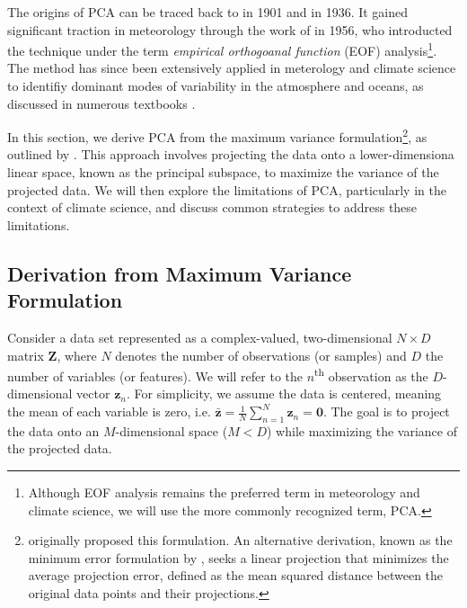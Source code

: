 The origins of PCA can be traced back to \citet{pearson_lines_1901} in 1901 and \citet{hotelling_relations_1936} in 1936. It gained significant traction in meteorology through the work of \citet{lorenz_empirical_1956} in 1956, who introducted the technique under the term \textit{empirical orthogoanal function} (EOF) analysis\footnote{Although EOF analysis remains the preferred term in meteorology and climate science, we will use the more commonly recognized term, PCA.}. The method has since been extensively applied in meterology and climate science to identifiy dominant modes of variability in the atmosphere and oceans, as discussed in numerous textbooks \cite[e.g.][]{preisendorfer_principal_1988,jolliffe_principal_2002,storch_statistical_2003,hannachi_patterns_2021,wilks_statistical_2019,delsole_statistical_2022}. 

In this section, we derive PCA from the maximum variance formulation\footnote{\citet{hotelling_relations_1936} originally proposed this formulation. An alternative derivation, known as the minimum error formulation by \citet{pearson_lines_1901}, seeks a linear projection that minimizes the average projection error, defined as the mean squared distance between the original data points and their projections.}, as outlined by \citet[][pp.~561-563]{bishop_pattern_2006}. This approach involves projecting the data onto a lower-dimensiona linear space, known as the principal subspace, to maximize the variance of the projected data. We will then explore the limitations of PCA, particularly in the context of climate science, and discuss common strategies to address these limitations.


\subsection{Derivation from Maximum Variance Formulation}
Consider a data set represented as a complex-valued, two-dimensional $N\times D$ matrix $\bm{Z}$, where $N$ denotes the number of observations (or samples) and $D$ the number of variables (or features). We will refer to the $n$\textsuperscript{th} observation as the $D$-dimensional vector $\bm{z}_n$. For simplicity, we assume the data is centered, meaning the mean of each variable is zero, i.e. $\bar{\bm{z}} = \frac{1}{N} \sum_{n=1}^{N} \bm{z}_n = \bm{0}$. The goal is to project the data onto an $M$-dimensional space ($M<D$) while maximizing the variance of the projected data. 

